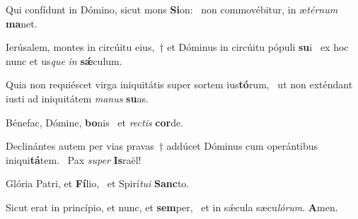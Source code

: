 \item Qui confídunt in Dómino, sicut mons \textbf{Si}on:~\psstar{} non commovébitur, in æ\textit{térnum} \textbf{ma}net.

\item Ierúsalem, montes in circúitu eius,~† et Dóminus in circúitu pópuli \textbf{su}i~\psstar{} ex hoc nunc et us\textit{que} \textit{in} \textbf{sǽ}culum.

\item Quia non requiéscet virga iniquitátis super sortem ius\textbf{tó}rum,~\psstar{} ut non exténdant iusti ad iniquitátem \textit{manus} \textbf{su}as.

\item Bénefac, Dómine, \textbf{bo}nis~\psstar{} et \textit{rectis} \textbf{cor}de.

\item Declinántes autem per vias pravas~† addúcet Dóminus cum operántibus iniqui\textbf{tá}tem.~\psstar{} Pax \textit{super} \textbf{Is}raël!

\item Glória Patri, et \textbf{Fí}lio,~\psstar{} et Spirí\textit{tui} \textbf{Sanc}to.

\item Sicut erat in princípio, et nunc, et \textbf{sem}per,~\psstar{} et in sǽcula sæcu\textit{lórum}. \textbf{A}men.